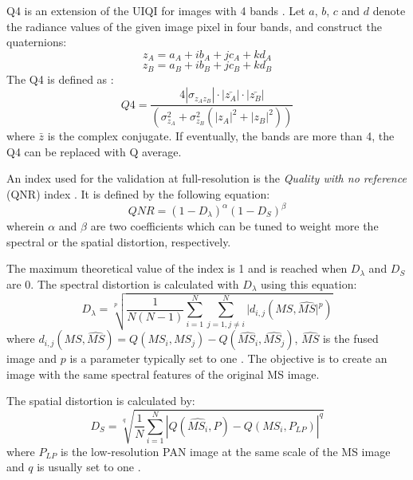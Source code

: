 \documentclass[12pt]{report}
\begin{document}
Q4 is an extension of the UIQI for images with 4 bands \cite{q4}. 
Let $a$, $b$, $c$ and $d$ denote the radiance values of the given image pixel in four bands, and construct the quaternions:
%
\begin{equation}
    z_A = a_A + ib_A + jc_A + kd_A
    \label{za}
\end{equation}
%
\begin{equation}
    z_B = a_B + ib_B + jc_B + kd_B
    \label{zb}
\end{equation}
%
The Q4 is defined as :
%
\begin{equation}
    Q4 = \frac{4 | \sigma_{z_A z_B}| \cdot |\bar{z_A}| \cdot |\bar{z_B}|}{(\sigma_{z_A}^2 + \sigma_{z_B}^2 (|z_A|^2 + |z_B|^2))}
    \label{q4}
\end{equation}
%
where $\bar{z}$ is the complex conjugate.
If eventually, the bands are more than 4, the Q4 can be replaced with Q average.

An index used for the validation at full-resolution is the \textit{Quality with no reference} (QNR) index \cite{qnr}.
It is defined by the following equation:
%
\begin{equation}
    QNR = (1-D_{\lambda})^\alpha (1 - D_S)^\beta
    \label{qnr}
\end{equation}
%
wherein $\alpha$ and $\beta$ are two coefficients which can be tuned to weight more
the spectral or the spatial distortion, respectively.

The maximum theoretical value of the index is 1 and is reached when $D_\lambda$ and $D_S$ are 0.
The spectral distortion is calculated with $D_\lambda$ using this equation:
%
\begin{equation}
    D_\lambda = \sqrt[p]{\frac{1}{N(N-1)} \sum_{i=1}^N \sum_{j=1, j \neq i}^N |d_{i,j}(MS, \widehat{MS}|^p)}
    \label{dl}
\end{equation}
%
where $d_{i,j}(MS, \widehat{MS}) = Q(MS_i, MS_j) - Q(\widehat{MS_i}, \widehat{MS_j})$, $\widehat{MS}$ is
the fused image and $p$ is a parameter typically set to one \cite{qnr}.
The objective is to create an image with the same spectral features of the original MS image.

The spatial distortion is calculated by:
%
\begin{equation}
    D_S = \sqrt[q]{\frac{1}{N} \sum_{i=1}^N |Q(\widehat{MS_i}, P) - Q(MS_i, P_{LP})|^q}
    \label{ds}
\end{equation}
%
where $P_{LP}$ is the low-resolution PAN image at the same scale of the MS image and $q$ is usually set to one \cite{qnr}.
\end{document}
